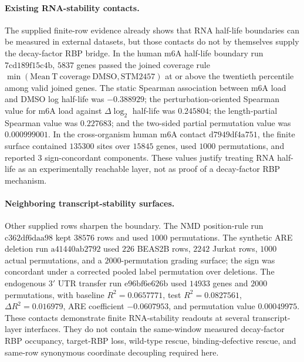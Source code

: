 \paragraph{Existing RNA-stability contacts.}
The supplied finite-row evidence already shows that RNA half-life boundaries can be measured in external datasets, but those contacts do not by themselves supply the decay-factor RBP bridge.  In the human m6A half-life boundary run $7\mathrm{cd}189\mathrm{f}15\mathrm{c}4\mathrm{b}$, $5837$ genes passed the joined coverage rule $\min(\mathrm{Mean\ T\ coverage\ DMSO},\mathrm{STM2457})$ at or above the twentieth percentile among valid joined genes.  The static Spearman association between m6A load and DMSO log half-life was $-0.388929$; the perturbation-oriented Spearman value for m6A load against $\Delta \log_2$ half-life was $0.245804$; the length-partial Spearman value was $0.227683$; and the two-sided partial permutation value was $0.000999001$.  In the cross-organism human m6A contact $\mathrm{d}7949\mathrm{df}4\mathrm{a}751$, the finite surface contained $135300$ sites over $15845$ genes, used $1000$ permutations, and reported $3$ sign-concordant components.  These values justify treating RNA half-life as an experimentally reachable layer, not as proof of a decay-factor RBP mechanism.

\paragraph{Neighboring transcript-stability surfaces.}
Other supplied rows sharpen the boundary.  The NMD position-rule run $\mathrm{c}362\mathrm{df}6\mathrm{daa}98$ kept $38576$ rows and used $1000$ permutations.  The synthetic ARE deletion run $\mathrm{a}41440\mathrm{ab}2792$ used $226$ BEAS2B rows, $2242$ Jurkat rows, $1000$ actual permutations, and a $2000$-permutation grading surface; the sign was concordant under a corrected pooled label permutation over deletions.  The endogenous $3'$ UTR transfer run $\mathrm{e}96\mathrm{bf}6\mathrm{e}626\mathrm{b}$ used $14933$ genes and $2000$ permutations, with baseline $R^2=0.0657771$, test $R^2=0.0827561$, $\Delta R^2=0.016979$, ARE coefficient $-0.0607953$, and permutation value $0.00049975$.  These contacts demonstrate finite RNA-stability readouts at several transcript-layer interfaces.  They do not contain the same-window measured decay-factor RBP occupancy, target-RBP loss, wild-type rescue, binding-defective rescue, and same-row synonymous coordinate decoupling required here.

